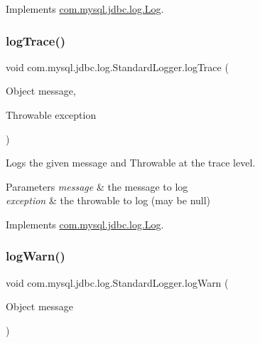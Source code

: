 Implements \mbox{\hyperlink{interfacecom_1_1mysql_1_1jdbc_1_1log_1_1_log_a8946382e4cf99819a43cdb3783fd0ee3}{com.\+mysql.\+jdbc.\+log.\+Log}}.

\mbox{\label{classcom_1_1mysql_1_1jdbc_1_1log_1_1_standard_logger_a5e5a12d72648c2316f561808a2d1410a}} 
\subsubsection{\texorpdfstring{log\+Trace()}{logTrace()}\hspace{0.1cm}{\footnotesize\ttfamily [2/2]}}
{\footnotesize\ttfamily void com.\+mysql.\+jdbc.\+log.\+Standard\+Logger.\+log\+Trace (\begin{DoxyParamCaption}\item[{Object}]{message,  }\item[{Throwable}]{exception }\end{DoxyParamCaption})}

Logs the given message and Throwable at the \textquotesingle{}trace\textquotesingle{} level.


\begin{DoxyParams}{Parameters}
{\em message} & the message to log \\
\hline
{\em exception} & the throwable to log (may be null) \\
\hline
\end{DoxyParams}


Implements \mbox{\hyperlink{interfacecom_1_1mysql_1_1jdbc_1_1log_1_1_log_a99ab17ccd9795acda736a284d9e32024}{com.\+mysql.\+jdbc.\+log.\+Log}}.

\mbox{\label{classcom_1_1mysql_1_1jdbc_1_1log_1_1_standard_logger_ab3a9b575254066c47662dd8489047afb}} 
\subsubsection{\texorpdfstring{log\+Warn()}{logWarn()}\hspace{0.1cm}{\footnotesize\ttfamily [1/2]}}
{\footnotesize\ttfamily void com.\+mysql.\+jdbc.\+log.\+Standard\+Logger.\+log\+Warn (\begin{DoxyParamCaption}\item[{Object}]{message }\end{DoxyParamCaption})}

